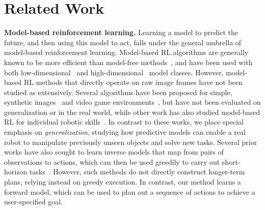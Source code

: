 \section{Related Work}\label{sec:rel_work}


\noindent \textbf{Model-based reinforcement learning.} Learning a model to predict the future, and then using this model to act, falls under the general umbrella of model-based reinforcement learning. Model-based RL algorithms are generally known to be more efficient than model-free methods~\cite{deisenroth2013survey}, and have been used with both low-dimensional~\cite{deisenroth2011pilco} and high-dimensional~\cite{deep_mpc} model classes. However, model-based RL methods that directly operate on raw image frames have not been studied as extensively. Several algorithms have been proposed for simple, synthetic images~\cite{watter2015embed} and video game environments~\cite{alexey, ha2018world, atarioh}, but have not been evaluated on generalization or in the real world, while other work has also studied model-based RL for individual robotic skills~\cite{dsae, zhang2018solar, se3}. In contrast to these works, we place special emphasis on \emph{generalization}, studying how predictive models can enable a real robot to manipulate previously unseen objects and solve new tasks.
Several prior works have also sought to learn inverse models that map from pairs of observations to actions, which can then be used greedily to carry out short-horizon tasks~\cite{agrawal2016learning,nair2017combining}. However, such methods do not directly construct longer-term plans, relying instead on greedy execution. In contrast, our method learns a forward model, which can be used to plan out a sequence of actions to achieve a user-specified goal.

